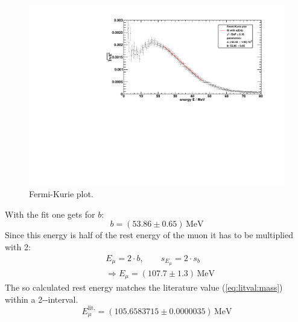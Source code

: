 \begin{figure}[H]
\begin{center}
  \includegraphics[width=\textwidth]{../img/betaspectrum_FermiKurie_fit.pdf}
  \caption{Fermi-Kurie plot.}
  \label{img:beta:fermikuriefit}
\end{center}
\end{figure}
With the fit one gets for $b$:
\begin{equation}
    b = (53.86 \pm 0.65)\,\text{MeV}
\end{equation}
Since this energy is half of the rest energy of the muon it has to be multiplied with 2:
\begin{equation}
\begin{split}
	\label{eq:result:mass}
    & E_\mu = 2 \cdot b, \qquad s_{E_\mu} = 2 \cdot s_b \\
    & \Rightarrow E_\mu = (107.7 \pm 1.3)\,\text{MeV}
    \end{split}
\end{equation}
The so calculated rest energy matches the literature value (\autoref{eq:litval:mass}) within a 2-\textsigma-interval.
\begin{equation}
    E_\mu^{\text{lit.}} = (105.6583715 \pm 0.0000035)\,\text{MeV}
\end{equation}

